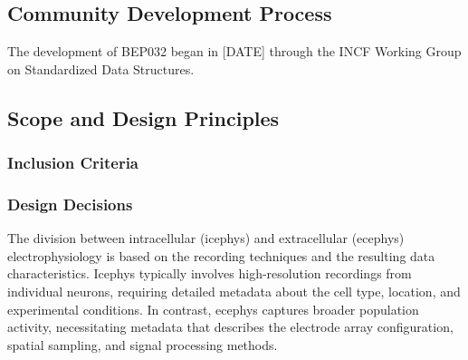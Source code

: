 \documentclass[fleqn,10pt]{wlscirep}
\begin{document}




\subsection*{Community Development Process}

The development of BEP032 began in [DATE] through the INCF Working Group on Standardized Data Structures.

\subsection*{Scope and Design Principles}

\subsubsection*{Inclusion Criteria}

\subsubsection*{Design Decisions}

The division between intracellular (icephys) and extracellular (ecephys) electrophysiology is based on the recording techniques and the resulting data characteristics. Icephys typically involves high-resolution recordings from individual neurons, requiring detailed metadata about the cell type, location, and experimental conditions. In contrast, ecephys captures broader population activity, necessitating metadata that describes the electrode array configuration, spatial sampling, and signal processing methods.
\end{document}
